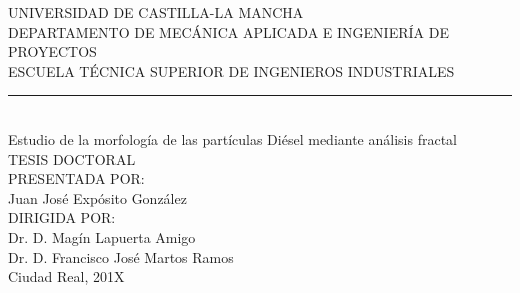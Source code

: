 \pagestyle{empty}
\begin{center}
\end{center}
\begin{center}
\vspace{0.5cm}
{\large UNIVERSIDAD DE CASTILLA-LA MANCHA}\\ \vspace{0.2cm}
{\large DEPARTAMENTO DE MECÁNICA APLICADA E INGENIERÍA DE PROYECTOS}\\ \vspace{0.2cm}
{\large ESCUELA TÉCNICA SUPERIOR DE INGENIEROS INDUSTRIALES}\\ \vspace{0.2cm}
\rule{\linewidth}{1.5pt}\\
\vspace{0.5cm}
\renewcommand{\baselinestretch}{2.0}
\large\normalsize
{\huge Estudio de la morfología de las partículas Diésel mediante análisis fractal}\\
\vspace{3.0cm}
\renewcommand{\baselinestretch}{1.0}
\large\normalsize
{\Large TESIS DOCTORAL}\\ \vspace{2.5cm}
{\Large PRESENTADA POR:}\\ \vspace{0.2cm}
{\Large Juan José Expósito González}\\ \vspace{0.8cm}
{\Large DIRIGIDA POR:}\\ \vspace{0.2cm}
{\Large Dr. D. Magín Lapuerta Amigo}\\ \vspace{0.2cm}
{\Large Dr. D. Francisco José Martos Ramos}\\ \vspace{1.5cm}
{\Large Ciudad Real, 201X}\\ \vspace{1.5cm}
\end{center}

\clearpage
